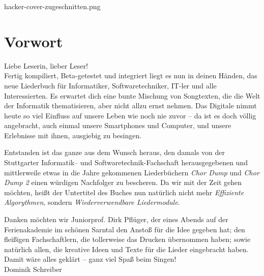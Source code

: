 \documentclass[11pt,a5paper]{article}
\def\maketitle{
		\vspace*{1.4cm}
			\begin{overpic}[width=11cm]{hacker-cover-zugeschnitten.png}
			\end{overpic}
		}
\begin{document}
			
	\maketitle
	\thispagestyle{empty}
	\pagebreak
	\tableofcontents
	\pagebreak
	
	\small
	
	\section*{Vorwort}
	
	Liebe Leserin, lieber Leser! \\
				
	Fertig kompiliert, Beta-getestet und integriert liegt es nun in deinen Händen, das neue Liederbuch für Informatiker, Softwaretechniker, IT-ler und alle Interessierten. 
	Es erwartet dich eine bunte Mischung von Songtexten, die die Welt der Informatik thematisieren, aber nicht allzu ernst nehmen. Das Digitale nimmt heute so viel Einfluss auf unsere Leben wie noch nie zuvor -- da ist es doch völlig angebracht, auch einmal unsere Smartphones und Computer, und unsere Erlebnisse mit ihnen, ausgiebig zu besingen.
	
	Entstanden ist das ganze aus dem Wunsch heraus, den damals von der Stuttgarter Informatik-- und Softwaretechnik-Fachschaft herausgegebenen und mittlerweile etwas in die Jahre gekommenen Liederbüchern \emph{Chor Dump} und \emph{Chor Dump 2} einen würdigen Nachfolger zu bescheren.
	Da wir mit der Zeit gehen möchten, heißt der Untertitel des Buches nun natürlich nicht mehr \emph{Effiziente Algorythmen}, sondern \emph{Wiederverwendbare Liedermodule}.
	
	Danken möchten wir Juniorprof. Dirk Pflüger, der eines Abends auf der Ferienakademie im schönen Sarntal den Anstoß für die Idee gegeben hat; den fleißigen Fachschaftlern, die tollerweise das Drucken übernommen haben; sowie natürlich allen, die kreative Ideen und Texte für die Lieder eingebracht haben. \\
	
	Damit wäre alles geklärt -- ganz viel Spaß beim Singen! \\
	
	\hfill Dominik Schreiber
	
	\pagebreak
\end{document}
